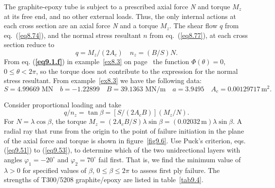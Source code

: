 \documentclass{AeroStructure-ERJohnson}
\begin{document}
\begin{example} \label{ex9.1}
\hspace*{-2pt}The graphite-epoxy tube is subject to a prescribed axial force \textit{N} and torque $\textit{M}_z$ at its free end, and no other external loads. Thus, the only internal actions at each cross section are an axial force \textit{N} and a torque $\textit{M}_z$. The shear flow $q$ from eq.~(\ref{eq8.74}), and the normal stress resultant $n$ from eq.~(\ref{eq8.77}), at each cross section reduce to
\begin{equation}
q=M_{z} /\left(2 A_{c}\right) \quad n_{z}=(B/S) N. \label{eq9.1.a}\tag{a}
\end{equation}
From eq. (\textbf{\ref{eq9.1.f}}) in example~\ref{ex8.3} on page~\pageref{ex8.3} the function $\Phi(\theta)=0$, $0 \leq \theta<2 \pi$, so the torque does not contribute to the expression for the normal stress resultant. From example~\ref{ex8.3} we have the following data:
\begin{equation*}
S=4.99669 \textrm{ MN} \quad b=-1.22899 \quad B=39.1363 \textrm{ MN}/\mathrm{m} \quad a=3.9495 \quad A_{c}=0.00129717\,\mathrm{m}^{2}.
\end{equation*}
\vspace*{2pt}
\clearpage

\noindent Consider proportional loading and take
\begin{equation}
q/n_{z}=\tan \beta=\left[S /\left(2 A_{c} B\right)\right]\left(M_{z}/N\right). \label{eq9.1.b}\tag{b}
\end{equation}
For $N=\lambda \cos \beta$, the torque $M_{z}=\left(2 A_{c} B/S\right) \lambda \sin \beta=(0.02032\,\mathrm{m}) \lambda \sin \beta$. A radial ray that runs from the origin to the point of failure initiation in the plane of the axial force and torque is shown in figure~\ref{fig9.6}. Use Puck's criterion, eqs. (\ref{eq9.51}) to (\ref{eq9.53}), to determine which of the two unidrectional layers with angles $\varphi_{1}=-20^{\circ}$ and $\varphi_{2}=70^{\circ}$ fail first. That is, we find the minimum value of $\lambda>0$ for specified values of $\beta$, $0 \leq \beta \leq 2 \pi$ to assess first ply failure. The strengths of T300/5208 graphite/epoxy are listed in table~\ref{tab9.4}.



\end{example}
\end{document}
